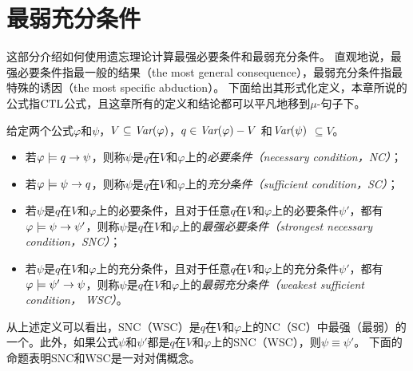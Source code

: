 \section{最弱充分条件}
\label{chapter04:sec:snc}
这部分介绍如何使用遗忘理论计算最强必要条件和最弱充分条件。
直观地说，最强必要条件指最一般的结果（the most general consequence），最弱充分条件指最特殊的诱因（the most specific abduction）。
下面给出其形式化定义，本章所说的公式指$\textrm{CTL}$公式，且这章所有的定义和结论都可以平凡地移到$\mu$-句子下。
\begin{definition}[充分和必要条件]\label{def:NC:SC}
	给定两个公式$\varphi$和$\psi$，$V \subseteq \textit{Var}(\varphi)$，$q\in\textit{Var}(\varphi)- V$
	和$\textit{Var}(\psi)$ $\subseteq V$。
	\begin{itemize}
		\item 若$\varphi \models q \rightarrow \psi$，则称$\psi$是$q$在$V$和$\varphi$上的{\em 必要条件（necessary condition，NC）}；
		\item 若$\varphi \models \psi\rightarrow q$，则称$\psi$是$q$在$V$和$\varphi$上的{\em 充分条件（sufficient condition，SC）}；
		\item 若$\psi$是$q$在$V$和$\varphi$上的必要条件，且对于任意$q$在$V$和$\varphi$上的必要条件$\psi'$，都有$\varphi\models\psi\rightarrow\psi'$，则称$\psi$是$q$在$V$和$\varphi$上的{\em 最强必要条件（strongest necessary condition，SNC）}；
		\item 若$\psi$是$q$在$V$和$\varphi$上的充分条件，且对于任意$q$在$V$和$\varphi$上的充分条件$\psi'$，都有$\varphi\models\psi'\rightarrow\psi$，则称$\psi$是$q$在$V$和$\varphi$上的{\em 最弱充分条件（weakest sufficient condition， WSC）}。
	\end{itemize}
\end{definition}

从上述定义可以看出，SNC（WSC）是$q$在$V$和$\varphi$上的NC（SC）中最强（最弱）的一个。此外，如果公式$\psi$和$\psi'$都是$q$在$V$和$\varphi$上的SNC（WSC），则$\psi \equiv \psi'$。
下面的命题表明SNC和WSC是一对对偶概念。

